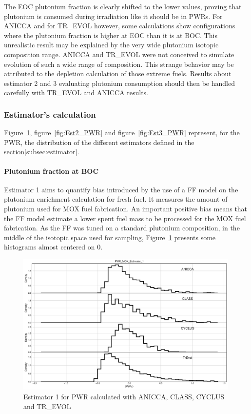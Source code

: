 The \gls{EOC} plutonium fraction is clearly shifted to the lower values, proving that
plutonium is consumed during irradiation like it should be in \gls{PWR}s. For ANICCA
and for TR\_EVOL however, some calculations show configurations where the
plutonium fraction is higher at \gls{EOC} than it is at \gls{BOC}. This unrealistic
result may be explained by the very wide plutonium isotopic composition range.
ANICCA and TR\_EVOL were not conceived to simulate evolution of such a wide range
of composition. This strange behavior may be attributed to the depletion
calculation of those extreme fuels. Results about estimator 2 and 3 evaluating
plutonium consumption should then be handled carefully with TR\_EVOL and ANICCA
results.   


\subsubsection{Estimator's calculation}

Figure~\ref{fig:Est1_PWR}, figure~\ref{fig:Est2_PWR} and
figure~\ref{fig:Est3_PWR} represent, for the \gls{PWR}, the distribution of the
different estimators defined in the section\ref{subsec:estimator}. 

\paragraph{Plutonium fraction at \gls{BOC}}

Estimator 1 aims to quantify bias introduced by the use of a \gls{FF} model on
the plutonium enrichment calculation for fresh fuel. It measures the amount of
plutonium used for \gls{MOX} fuel fabrication. An important positive bias means
that the \gls{FF} model estimate a lower spent fuel mass to be processed for
the MOX fuel fabrication. As the \gls{FF} was tuned on a standard plutonium
composition, in the middle of the isotopic space used for sampling,
Figure~\ref{fig:Est1_PWR} presents some histograms almost centered on 0.
        

\begin{figure}[h]
	\begin{center}
		\includegraphics[width = 0.99\textwidth]{../../Feature_1/RAW_DATA/FIG/PWR_MOX_Estimator_1.pdf}
		\caption{Estimator 1 for \gls{PWR} calculated with ANICCA, CLASS, CYCLUS and TR\_EVOL}
		\label{fig:Est1_PWR}
	\end{center}
\end{figure}

